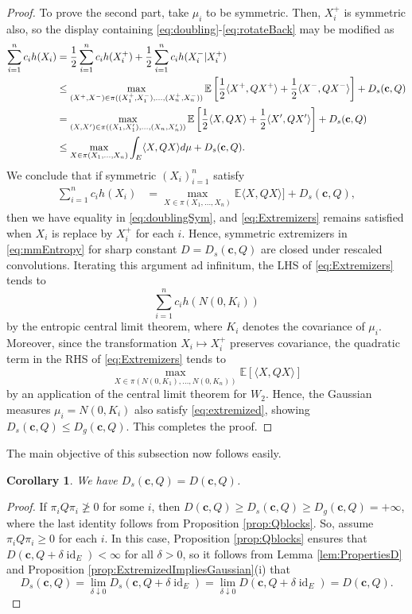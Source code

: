 \documentclass[10pt]{article}
\newtheorem{corollary}[theorem]{Corollary}
\newcommand{\id}{\operatorname{id}}
\newcommand{\EE}{\mathbb{E}}
\begin{document}
\begin{proof}
To prove the second part, take $\mu_i$ to be symmetric.  Then, $X_i^+$ is symmetric also, so the display containing \eqref{eq:doubling}-\eqref{eq:rotateBack} may be modified as
\begin{align}
 \sum_{i=1}^n c_i h(X_i) &= \frac{1}{2}\sum_{i=1}^n c_i h(X^+_i) + \frac{1}{2}\sum_{i=1}^n c_i   h(X^-_i|X^+_i)  \notag \\
 &\leq \max_{(X^+,X^-)\in \pi((X^+_1,X^-_1), \dots, (X^+_n,X^-_n)) } \EE\left[  \frac{1}{2}\langle X^+, Q X^+\rangle +  \frac{1}{2}\langle X^-, Q X^- \rangle \right]
 +  D_s(\mathbf{c},Q) \label{eq:doublingSym}\\
 &= \max_{(X,X')\in \pi((X_1,X'_1), \dots, (X_n,X_n')) } \EE\left[  \frac{1}{2}\langle X, Q X\rangle +  \frac{1}{2}\langle X', Q X' \rangle \right]
 +  D_s(\mathbf{c},Q)   \notag\\
   &\leq  \max_{X \in \pi( X_1, \dots, X_n ) }  \int_E \langle X, Q X\rangle d\mu  +  D_s(\mathbf{c},Q) . \notag
\end{align}
We conclude that  if symmetric $(X_i)_{i=1}^n$ satisfy 
\begin{align}
 \sum_{i=1}^n c_i h(X_i) &=  \max_{X \in \pi( X_1, \dots, X_n ) }  \EE \langle X, Q X\rangle ]  + D_s(\mathbf{c},Q), \label{eq:Extremizers}
\end{align}
then we have equality in \eqref{eq:doublingSym}, and \eqref{eq:Extremizers} remains satisfied when $X_i$ is replace by $X^+_i$ for each $i$.  Hence,  symmetric extremizers in \eqref{eq:mmEntropy} for sharp constant $D = D_s(\mathbf{c},Q)$ are closed under rescaled convolutions.  Iterating this argument ad infinitum, the LHS of \eqref{eq:Extremizers} tends to 
$$
\sum_{i=1}^n c_i h(N(0,K_i))
$$
by the entropic central limit theorem, where $K_i$ denotes the covariance of $\mu_i$.  Moreover, since the transformation $X_i \mapsto X^+_i$ preserves covariance, the quadratic term in the RHS of \eqref{eq:Extremizers} tends to 
$$
 \max_{X \in \pi( N(0,K_1), \dots, N(0,K_n) ) }  \EE[ \langle X, Q X\rangle ]  
$$
by an application of the  central limit theorem for $W_2$.  Hence, the Gaussian measures  $\mu_i = N(0,K_i)$ also satisfy \eqref{eq:extremized}, showing $D_s(\mathbf{c},Q) \leq D_g(\mathbf{c},Q)$.  This completes the proof. 
\end{proof}

The main objective of this subsection now follows easily. 
\begin{corollary}\label{cor:DsEqualsD}
We have $D_s(\mathbf{c},Q)  = D(\mathbf{c},Q)$.
\end{corollary}
\begin{proof}
If $\pi_i Q \pi_i \not\geq 0$ for some $i$, then $D(\mathbf{c},Q)  \geq  D_s(\mathbf{c},Q) \geq D_g(\mathbf{c},Q) = +\infty$, where the last identity follows from Proposition \ref{prop:Qblocks}. So, assume $\pi_i Q \pi_i \geq 0$ for each $i$.  In this case, Proposition \ref{prop:Qblocks} ensures that $D(\mathbf{c},Q+\delta \id_E) <\infty$ for all $\delta>0$, so it follows from Lemma \ref{lem:PropertiesD} and Proposition \ref{prop:ExtremizedImpliesGaussian}(i)  that
$$
D_s(\mathbf{c},Q) = \lim_{\delta\downarrow 0} D_s(\mathbf{c},Q+\delta \id_E) = \lim_{\delta\downarrow 0} D(\mathbf{c},Q+\delta \id_E) =D(\mathbf{c},Q).
$$
\end{proof}
\end{document}
